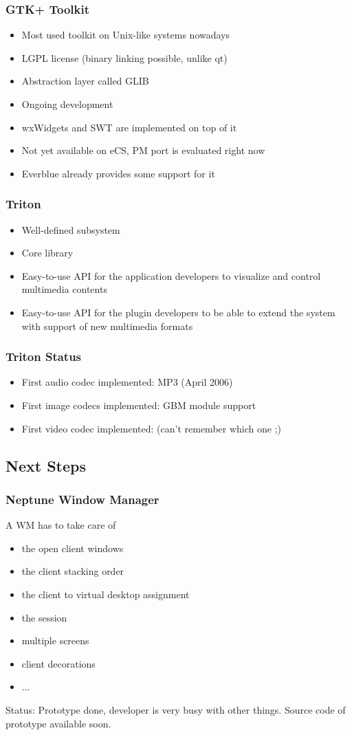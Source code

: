\documentclass{beamer}
\begin{document}
\begin{frame}
\frametitle{GTK+ Toolkit}
\begin{itemize}[<+->]
  \item Most used toolkit on Unix-like systems nowadays
  \item LGPL license (binary linking possible, unlike qt)
  \item Abstraction layer called GLIB
  \item Ongoing development
  \item wxWidgets and SWT are implemented on top of it
  \item Not yet available on eCS, PM port is evaluated right now
  \item Everblue already provides some support for it
\end{itemize}
\end{frame}

\begin{frame}
\frametitle{Triton}
\begin{itemize}[<+->]
	\item Well-defined subsystem
	\item Core library
	\item Easy-to-use API for the application developers to visualize and control multimedia contents
	\item Easy-to-use API for the plugin developers to be able to extend the system with support of new multimedia formats
\end{itemize}
\end{frame}

\begin{frame}
\frametitle{Triton Status}
\begin{itemize}[<+->]
  \item First audio codec implemented: MP3 (April 2006)
  \item First image codecs implemented: GBM module support
  \item First video codec implemented: (can't remember which one ;)
\end{itemize}
\end{frame}


\subsection{Next Steps}

\begin{frame}
\frametitle{Neptune Window Manager}
A WM has to take care of
\begin{itemize}[<+->]
  \item the open client windows
  \item the client stacking order
  \item the client to virtual desktop assignment
  \item the session
  \item multiple screens
  \item client decorations
  \item ...
\end{itemize}
Status: Prototype done, developer is very busy with other things. Source code
of prototype available soon.
\end{frame}
\end{document}
